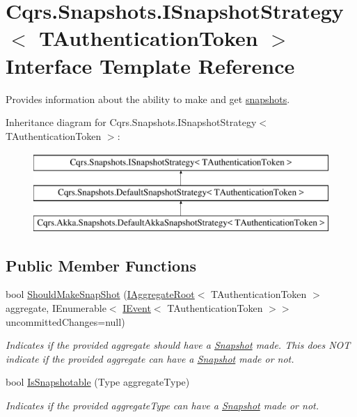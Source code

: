 \hypertarget{interfaceCqrs_1_1Snapshots_1_1ISnapshotStrategy}{}\section{Cqrs.\+Snapshots.\+I\+Snapshot\+Strategy$<$ T\+Authentication\+Token $>$ Interface Template Reference}
\label{interfaceCqrs_1_1Snapshots_1_1ISnapshotStrategy}


Provides information about the ability to make and get \hyperlink{classCqrs_1_1Snapshots_1_1Snapshot}{snapshots}.  


Inheritance diagram for Cqrs.\+Snapshots.\+I\+Snapshot\+Strategy$<$ T\+Authentication\+Token $>$\+:\begin{figure}[H]
\begin{center}
\leavevmode
\includegraphics[height=3.000000cm]{interfaceCqrs_1_1Snapshots_1_1ISnapshotStrategy}
\end{center}
\end{figure}
\subsection*{Public Member Functions}
\begin{DoxyCompactItemize}
\item 
bool \hyperlink{interfaceCqrs_1_1Snapshots_1_1ISnapshotStrategy_aeb5fc714ec8a5b60219426f3aabc0f6c_aeb5fc714ec8a5b60219426f3aabc0f6c}{Should\+Make\+Snap\+Shot} (\hyperlink{interfaceCqrs_1_1Domain_1_1IAggregateRoot}{I\+Aggregate\+Root}$<$ T\+Authentication\+Token $>$ aggregate, I\+Enumerable$<$ \hyperlink{interfaceCqrs_1_1Events_1_1IEvent}{I\+Event}$<$ T\+Authentication\+Token $>$$>$ uncommitted\+Changes=null)
\begin{DoxyCompactList}\small\item\em Indicates if the provided {\itshape aggregate}  should have a \hyperlink{classCqrs_1_1Snapshots_1_1Snapshot}{Snapshot} made. This does N\+OT indicate if the provided {\itshape aggregate}  can have a \hyperlink{classCqrs_1_1Snapshots_1_1Snapshot}{Snapshot} made or not. \end{DoxyCompactList}\item 
bool \hyperlink{interfaceCqrs_1_1Snapshots_1_1ISnapshotStrategy_a02121821312c4ce2811b31eeaffabe51_a02121821312c4ce2811b31eeaffabe51}{Is\+Snapshotable} (Type aggregate\+Type)
\begin{DoxyCompactList}\small\item\em Indicates if the provided {\itshape aggregate\+Type}  can have a \hyperlink{classCqrs_1_1Snapshots_1_1Snapshot}{Snapshot} made or not. \end{DoxyCompactList}\end{DoxyCompactItemize}


